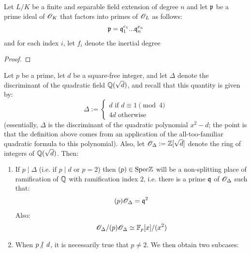            \begin{theorem}
                Let $L/K$ be a finite and separable field extension of degree $n$ and let $\mathfrak{p}$ be a prime ideal of $\mathscr{O}_K$ that factors into primes of $\mathscr{O}_L$ as follows:
                    $$\mathfrak{p} = \mathfrak{q}_1^{e_1}...\mathfrak{q}_n^{e_n}$$
                and for each index $i$, let $f_i$ denote the inertial degree 
            \end{theorem}
                \begin{proof}
                    
                \end{proof}
            \begin{corollary} \label{coro: ramification_quadratic_fields}
                Let $p$ be a prime, let $d$ be a square-free integer, and let $\Delta$ denote the discriminant of the quadratic field $\mathbb{Q}(\sqrt{d})$, and recall that this quantity is given by:
                    $$
                        \Delta := 
                        \begin{cases}
                            \text{$d$ if $d \equiv 1 \pmod{4}$}
                            \\
                            \text{$4d$ otherwise}
                        \end{cases}
                    $$
                (essentially, $\Delta$ is the discriminant of the quadratic polynomial $x^2 - d$; the point is that the definition above comes from an application of the all-too-familiar quadratic formula to this polynomial). Also, let $\mathscr{O}_{\Delta} := \mathbb{Z}[\sqrt{d}]$ denote the ring of integers of $\mathbb{Q}(\sqrt{d})$. Then:
                    \begin{enumerate}
                        \item If $p \mid \Delta$ (i.e. if $p \mid d$ or $p = 2$) then $(p) \in \mathrm{Spec} \mathbb{Z}$ will be a non-splitting place of ramification of $\mathbb{Q}$ with ramification index $2$, i.e. there is a prime $\mathfrak{q}$ of $\mathscr{O}_{\Delta}$ such that:
                            $$(p)\mathscr{O}_{\Delta} = \mathfrak{q}^2$$
                        Also:
                            $$\mathscr{O}_{\Delta}/(p)\mathscr{O}_{\Delta} \simeq \mathbb{F}_p[x]/(x^2)$$
                        \item When $p \hspace{-2pt}\not|\hspace{5pt} d$, it is necessarily true that $p 
                        \not = 2$. We then obtain two subcases:
                            \begin{enumerate}

\end{enumerate}
\end{enumerate}
\end{corollary}
